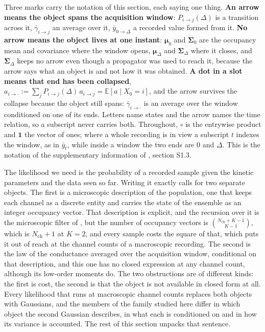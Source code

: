 Three marks carry the notation of this section, each saying one thing. \textbf{An arrow means the
object spans the acquisition window}: $P_{i\to j}(\Delta)$ is a transition across it,
$\bar\gamma_{i\to j}$ an average over it, $\bar y_{0\to\Delta}$ a recorded value formed from it.
\textbf{No arrow means the object lives at one instant}: $\bm{\mu}_0$ and $\bm{\Sigma}_0$ are the
occupancy mean and covariance where the window opens, $\bm{\mu}_\Delta$ and $\bm{\Sigma}_\Delta$
where it closes, and $\bm{\Sigma}_\Delta$ keeps no arrow even though a propagator was used to reach
it, because the arrow says what an object is and not how it was obtained. \textbf{A dot in a slot
means that end has been collapsed}, $a_{i\to\cdot}:=\sum_j P_{i\to j}(\Delta)\,a_{i\to j}
=\mathbb{E}[a\mid X_0=i]$, and the arrow survives the collapse because the object still spans:
$\bar\gamma_{i\to\cdot}$ is an average over the window conditioned on one of its ends. Letters name
states and the arrow names the time relation, so a subscript never carries both. Throughout,
$\circ$ is the entrywise product and $\mathbf{1}$ the vector of ones; where a whole recording is in
view a subscript $t$ indexes the window, as in $\bar y_t$, while inside a window the two ends are
$0$ and $\Delta$. This is the notation of the supplementary information of
\citet{moffatt2025bayesian}, section S1.3.

The likelihood we need is the probability of a recorded sample given the kinetic
parameters and the data seen so far. Writing it exactly calls for two separate objects. The
first is a microscopic description of the population, one that keeps each channel as a
discrete entity and carries the state of the ensemble as an integer occupancy vector. That
description is explicit, and the recursion over it is the microscopic filter of
\citet{moffatt2007estimation}, but the number of occupancy vectors is
$\binom{N_{\mathrm{ch}}+K-1}{K-1}$, which is $N_{\mathrm{ch}}+1$ at $K=2$, and every sample
costs the square of that, which puts it out of reach at the channel counts of a macroscopic
recording. The second is the law of the
conductance averaged over the acquisition window, conditional on that description, and this
one has no closed expression at any channel count, although its low-order moments do. The
two obstructions are of different kinds: the first is cost, the second is that the object
is not available in closed form at all. Every likelihood that runs at macroscopic channel
counts replaces both objects with Gaussians, and the members of the family studied here
differ in which object the second Gaussian describes, in what each is conditioned on and in
how its variance is accounted. The rest of this section unpacks that sentence.

